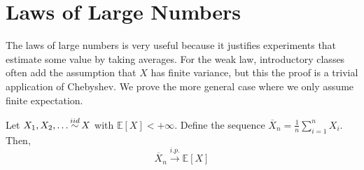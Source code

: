 \section{Laws of Large Numbers} 

  The laws of large numbers is very useful because it justifies experiments that estimate some value by taking averages. For the weak law, introductory classes often add the assumption that $X$ has finite variance, but this the proof is a trivial application of Chebyshev. We prove the more general case where we only assume finite expectation. 	

  \begin{theorem}
    \label{thm:weak-law-of-large-numbers}
		Let $X_1, X_2, \ldots \iidsim X$ with $\mathbb{E}[X] < +\infty$. Define the sequence $\overline{X}_n = \frac{1}{n} \sum_{i = 1}^n X_i$. Then, 
		\begin{equation}
			\overline{X}_n \xrightarrow{i.p.} \mathbb{E}[X] 
		\end{equation}
  \end{theorem}
